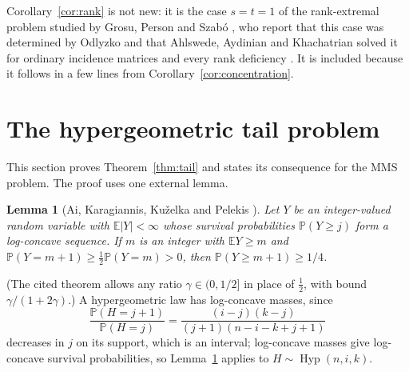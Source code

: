 \documentclass[11pt]{article}
\newtheorem{lemma}[theorem]{Lemma}
\theoremstyle{remark}
\newcommand{\Prb}{\mathbb P}
\newcommand{\E}{\mathbb E}
\newcommand{\Hyp}{\operatorname{Hyp}}
\begin{document}
Corollary~\ref{cor:rank} is not new: it is the case \(s=t=1\) of the
rank-extremal problem studied by Grosu, Person and Szab\'o \cite{GPS}, who
report that this case was determined by Odlyzko and that Ahlswede, Aydinian
and Khachatrian solved it for ordinary incidence matrices and every rank
deficiency
\cite[Section~2, Remark]{GPS}. It is included because it follows in a few
lines from Corollary~\ref{cor:concentration}.

\section{The hypergeometric tail problem}\label{sec:tail}

This section proves Theorem~\ref{thm:tail} and states its consequence for the
MMS problem. The proof uses one external lemma.

\begin{lemma}[{Ai, Karagiannis, Ku\v{z}elka and Pelekis \cite[Theorem~2]{AKKP}}]\label{lem:AKKP}
Let \(Y\) be an integer-valued random variable with \(\E|Y|<\infty\) whose
survival probabilities \(\Prb(Y\ge j)\) form a log-concave sequence. If
\(m\) is an integer with \(\E Y\ge m\) and
\(\Prb(Y=m+1)\ge\tfrac12\Prb(Y=m)>0\), then \(\Prb(Y\ge m+1)\ge1/4\).
\end{lemma}
(The cited theorem allows any ratio \(\gamma\in(0,1/2]\) in place of
\(\tfrac12\), with bound \(\gamma/(1+2\gamma)\).) A hypergeometric law has
log-concave masses, since
\[
 \frac{\Prb(H=j+1)}{\Prb(H=j)}=\frac{(i-j)(k-j)}{(j+1)(n-i-k+j+1)}
\]
decreases in \(j\) on its support, which is an interval; log-concave masses
give log-concave survival probabilities, so Lemma~\ref{lem:AKKP} applies to
\(H\sim\Hyp(n,i,k)\).
\end{document}
